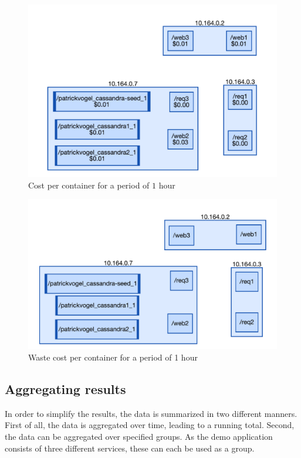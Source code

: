 \begin{figure}[H]
    \centering
    \includegraphics[width=\textwidth]{gfx/demo_cost}
    \caption{Cost per container for a period of $1$ hour}
    \label{fig:demo_cost}
\end{figure}

\begin{figure}[H]
    \centering
    \includegraphics[width=\textwidth]{gfx/demo_app}
    \caption{Waste cost per container for a period of 1 hour}
    \label{fig:demo_waste}
\end{figure}

\subsection{Aggregating results}
In order to simplify the results, the data is summarized in two different manners. First of all, the data is aggregated over time, leading to a running total. Second, the data can be aggregated over specified groups. As the demo application consists of three different services, these can each be used as a group.\\

